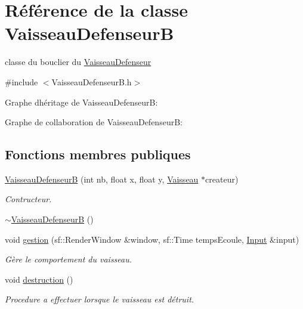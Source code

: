 \hypertarget{class_vaisseau_defenseur_b}{}\section{Référence de la classe Vaisseau\+DefenseurB}
\label{class_vaisseau_defenseur_b}


classe du bouclier du \hyperlink{class_vaisseau_defenseur}{Vaisseau\+Defenseur}  




{\ttfamily \#include $<$Vaisseau\+Defenseur\+B.\+h$>$}



Graphe d\textquotesingle{}héritage de Vaisseau\+DefenseurB\+:


Graphe de collaboration de Vaisseau\+DefenseurB\+:
\subsection*{Fonctions membres publiques}
\begin{DoxyCompactItemize}
\item 
\hyperlink{class_vaisseau_defenseur_b_a7f6ddaa53d153a14a760bc51945ebb30}{Vaisseau\+DefenseurB} (int nb, float x, float y, \hyperlink{class_vaisseau}{Vaisseau} $\ast$createur)
\begin{DoxyCompactList}\small\item\em Contructeur. \end{DoxyCompactList}\item 
\hyperlink{class_vaisseau_defenseur_b_acb6347ed84b0364d36bf581d7a3e1129}{$\sim$\+Vaisseau\+DefenseurB} ()
\item 
void \hyperlink{class_vaisseau_defenseur_b_aae8e2488b91dbd1ceef8969debbc234f}{gestion} (sf\+::\+Render\+Window \&window, sf\+::\+Time temps\+Ecoule, \hyperlink{_input_8h_a5588d60d674991c719a8df848313e966}{Input} \&input)
\begin{DoxyCompactList}\small\item\em Gère le comportement du vaisseau. \end{DoxyCompactList}\item 
void \hyperlink{class_vaisseau_defenseur_b_aba88319dcc7540dce39c164fa9853732}{destruction} ()
\begin{DoxyCompactList}\small\item\em Procedure a effectuer lorsque le vaisseau est détruit. \end{DoxyCompactList}\end{DoxyCompactItemize}
